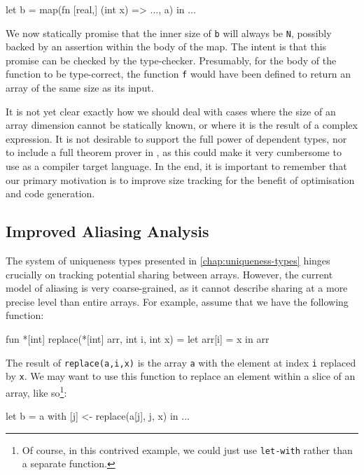 \begin{colorcode}
let b = map(fn [real,] (int x) =>
              ...,
            a) in
...
\end{colorcode}

We now statically promise that the inner size of \texttt{b} will
always be \texttt{N}, possibly backed by an assertion within the body
of the map.  The intent is that this promise can be checked by the
type-checker.  Presumably, for the body of the function to be
type-correct, the function \texttt{f} would have been defined to
return an array of the same size as its input.

It is not yet clear exactly how we should deal with cases where the
size of an array dimension cannot be statically known, or where it is
the result of a complex expression.  It is not desirable to support
the full power of dependent types, nor to include a full theorem
prover in \LO{}, as this could make it very cumbersome to use \LO{} as
a compiler target language.  In the end, it is important to remember
that our primary motivation is to improve size tracking for the
benefit of optimisation and code generation.

\subsection{Improved Aliasing Analysis}
\label{sec:improved-aliasing-analysis}

The system of uniqueness types presented in
\cref{chap:uniqueness-types} hinges crucially on tracking potential
sharing between arrays.  However, the current model of aliasing is
very coarse-grained, as it cannot describe sharing at a more precise
level than entire arrays.  For example, assume that we have the
following function:

\begin{colorcode}
  fun *[int] replace(*[int] arr, int i, int x) =
    let arr[i] = x in arr
\end{colorcode}

The result of \texttt{replace(a,i,x)} is the array \texttt{a} with the
element at index \texttt{i} replaced by \texttt{x}.  We may want to
use this function to replace an element within a slice of an array,
like so\footnote{Of course, in this contrived example, we could just
  use \texttt{let-with} rather than a separate function.}:

\begin{colorcode}
let b = a with [j] <- replace(a[j], j, x) in
...
\end{colorcode}

